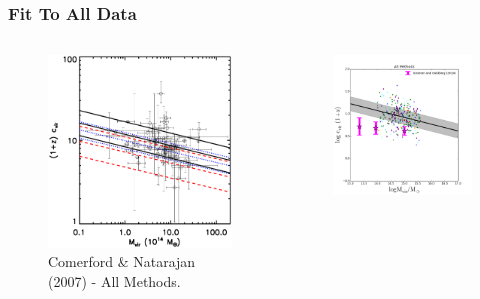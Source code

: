 \documentclass[hyperref={pdfpagelabels=false}]{beamer}
\begin{document}
\begin{frame}
\frametitle{Fit To All Data}
  \begin{columns}
    \begin{column}{0.5\textwidth}
      \begin{figure}
        \includegraphics[width=\textwidth]{cn07.eps}
        \caption{Comerford \& Natarajan (2007) - All Methods.}
      \end{figure}  
    \end{column}
    \begin{column}{0.5\textwidth}
      \begin{figure}
        \includegraphics[width=\textwidth]{AllMethodsWithSims_linearmodel_witherror.png}

\end{figure}
\end{column}
\end{columns}
\end{frame}
\end{document}

